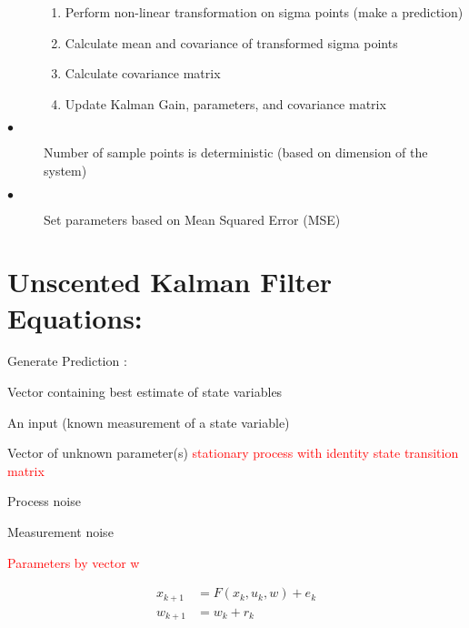 \documentclass{article}
\begin{document}
\begin{description}
\begin{enumerate}
            \item Perform non-linear transformation on sigma points (make a prediction)
            \item Calculate mean and covariance of transformed sigma points
            \item Calculate covariance matrix
            \item Update Kalman Gain, parameters, and covariance matrix
        \end{enumerate}
  \item[$\bullet $] Number of sample points is deterministic (based on dimension of the system) \cite{inproceedings}
  \item[$\bullet$] Set parameters based on Mean Squared Error (MSE) \cite{inbook, Wan01theunscented}
\end{description} 



\section{Unscented Kalman Filter Equations:}
Generate Prediction \cite{article4, article} : 
\begin{description}[labelindent=1cm]
    \item[$\bullet  x_{k}: $] Vector containing best estimate of state variables
    \item[$\bullet  u_{k}: $] An input (known measurement of a state variable)
    \item[$\bullet  w: $] Vector of unknown parameter(s) \textcolor{red}{stationary process with identity state transition matrix} 
    \item[$\bullet  r_k: $] Process noise
    \item[$\bullet  e_k: $] Measurement noise
    \item[$\bullet  F: $] \textcolor{red}{Parameters by vector w} 
\end{description}
\begin{align*}
    x_{k+1} &= F(x_k, u_k, w) + e_k \\
    w_{k+1} &= w_k + r_k 
\end{align*}
\end{document}
